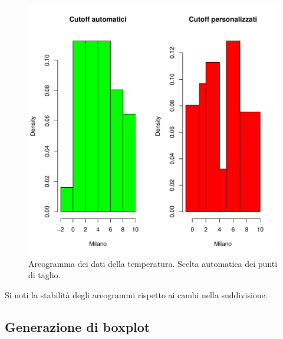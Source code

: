 \documentclass[onecolumn,12pt]{book}\usepackage[]{graphicx}\usepackage[]{color}
\makeatletter
\def\maxwidth{ %
  \ifdim\Gin@nat@width>\linewidth
    \linewidth
  \else
    \Gin@nat@width
  \fi
}
\newenvironment{knitrout}{}{} %
\makeatother
\begin{document}
\begin{figure}[htbp]
\begin{center}
\begin{knitrout}
\color{fgcolor}
\includegraphics[width=\maxwidth]{figure/unnamed-chunk-109-1} 

\end{knitrout}
\caption{ Areogramma dei dati della temperatura. Scelta automatica dei punti di taglio.}
\label{fig:datiistmilano}
\end{center}
\end{figure}
Si noti la stabilit\`a degli areogrammi rispetto ai cambi nella suddivisione.
\subsection{Generazione di boxplot}
\end{document}
